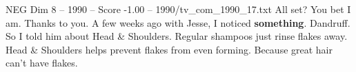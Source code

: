 \begin{textsample}{NEG Dim 8 – 1990 – Score -1.00 – 1990/tv\_com\_1990\_17.txt}  \label{ex:f8_neg_028}
All set?
You bet I am.
Thanks to you.
A few weeks ago with Jesse, I noticed \textbf{something}.
Dandruff.
So I told him about Head \& Shoulders.
Regular shampoos just rinse flakes away.
Head \& Shoulders helps prevent flakes from even forming.
Because great hair can't have flakes.

\end{textsample}
